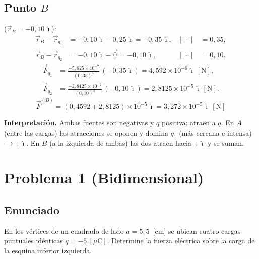 \documentclass[12pt,letterpaper]{article}
\begin{document}
\subsection*{Punto $B$} ($\vec r_B=-0{,}10\,\hat\imath$):
\begin{align*}
\vec r_B-\vec r_{q_1} &= -0{,}10\,\hat\imath-0{,}25\,\hat\imath = -0{,}35\,\hat\imath, & \lVert\cdot\rVert &= 0{,}35,\\
\vec r_B-\vec r_{q_2} &= -0{,}10\,\hat\imath-\vec 0 = -0{,}10\,\hat\imath, & \lVert\cdot\rVert &= 0{,}10.
\end{align*}
\begin{align*}
\vec F_{q_1} &= \frac{-5{,}625\times10^{-7}}{(0{,}35)^3}\,(-0{,}35\,\hat\imath) = 4{,}592\times10^{-6}\,\hat\imath\ [\text{N}],\\[2pt]
\vec F_{q_2} &= \frac{-2{,}8125\times10^{-7}}{(0{,}10)^3}\,(-0{,}10\,\hat\imath) = 2{,}8125\times10^{-5}\,\hat\imath\ [\text{N}].
\end{align*}
\[
\boxed{\vec F^{(B)} = (0{,}4592+2{,}8125)\times10^{-5}\,\hat\imath = 3{,}272\times10^{-5}\,\hat\imath\ [\text{N}]}
\]

\noindent\textbf{Interpretaci\'on.} Ambas fuentes son negativas y $q$ positiva: atraen a $q$. En $A$ (entre las cargas) las atracciones se oponen y domina $q_1$ (m\'as cercana e intensa) $\to+\hat\imath$. En $B$ (a la izquierda de ambas) las dos atraen hacia $+\hat\imath$ y se suman.

\newpage
\section*{Problema 1 (Bidimensional)}

\subsection*{Enunciado}

En los v\'ertices de un cuadrado de lado $a = 5{,}5$~[cm] se ubican cuatro cargas puntuales id\'enticas $q = -5\ [\mu\text{C}]$. Determine la fuerza el\'ectrica sobre la carga de la esquina inferior izquierda.

\medskip
\end{document}
